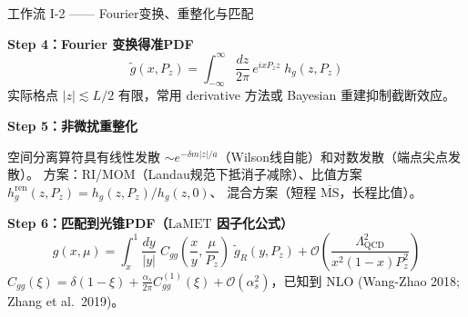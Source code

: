 \documentclass[10pt,aspectratio=169]{beamer}
\newcommand{\msbar}{\overline{\mathrm{MS}}}
\newcommand{\lqcd}{\Lambda_{\mathrm{QCD}}}
\newcommand{\LaMET}{\mathrm{LaMET}}
\begin{document}
\begin{frame}{工作流 I-2 —— Fourier变换、重整化与匹配}

  \textbf{Step 4：Fourier 变换得准PDF}
  \begin{equation*}
    \tilde{g}(x, P_z) = \int_{-\infty}^{\infty} \frac{dz}{2\pi}\,
    e^{i x P_z z}\; h_g(z, P_z)
  \end{equation*}
  实际格点 $|z| \lesssim L/2$ 有限，常用 derivative 方法或 Bayesian 重建抑制截断效应。

  \textbf{Step 5：非微扰重整化}

  空间分离算符具有线性发散 $\sim e^{-\delta m|z|/a}$（Wilson线自能）和对数发散（端点尖点发散）。
  方案：RI/MOM（Landau规范下抵消子减除）、比值方案 $h_g^{\mathrm{ren}}(z,P_z) = h_g(z,P_z)/h_g(z,0)$、
  混合方案（短程 $\msbar$，长程比值）。

  \textbf{Step 6：匹配到光锥PDF（$\LaMET$ 因子化公式）}
  \begin{equation*}
    \boxed{
      g(x, \mu) = \int_{x}^{1} \frac{dy}{|y|}\;
      C_{gg}\!\left(\frac{x}{y}, \frac{\mu}{P_z}\right)\;
      \tilde{g}_R(y, P_z)
      + \mathcal{O}\!\left(\frac{\lqcd^2}{x^2(1-x)P_z^2}\right)
    }
  \end{equation*}
  $C_{gg}(\xi) = \delta(1-\xi) + \frac{\alpha_s}{2\pi} C_{gg}^{(1)}(\xi) + \mathcal{O}(\alpha_s^2)$，已知到 NLO
  (Wang-Zhao 2018; Zhang et al.\ 2019)。\vspace{-8pt}
\end{frame}
\end{document}
